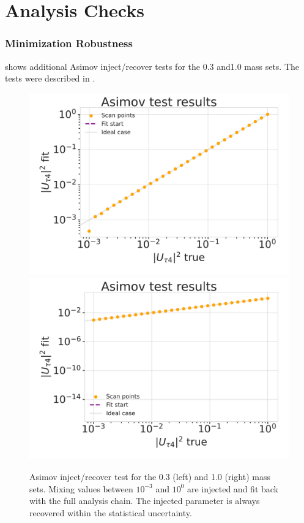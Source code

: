 
\chapter{Analysis Checks}

\subsection{Minimization Robustness} 

 shows additional Asimov inject/recover tests for the \SI{0.3}{\gev} and\SI{1.0}{\gev} mass sets. The tests were described in .

\begin{figure}[h]
    \includegraphics[width=0.49\linewidth]{figures/results/checks/asimov_scan_0.3_GeV-01.png}
    \includegraphics[width=0.49\linewidth]{figures/results/checks/asimov_scan_1.0_GeV-01.png}
	\caption[Asimov inject/recover test (\SI{0.3}{\gev}, \SI{1.0}{\gev})]{Asimov inject/recover test for the \SI{0.3}{\gev} (left) and \SI{1.0}{\gev} (right) mass sets. Mixing values between $10^{-3}$ and $10^{0}$ are injected and fit back with the full analysis chain. The injected parameter is always recovered within the statistical uncertainty.}
\end{figure}



